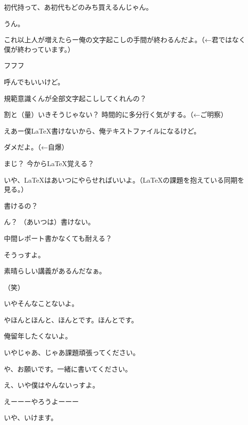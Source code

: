 \begin{multicols}{3}
{        初代持って、あ初代もどのみち買えるんじゃん。

        うん。

    


    

        これ以上人が増えたらー俺の文字起こしの手間が終わるんだよ。（←君ではなく僕が終わっています。）

        フフフ

        呼んでもいいけど。

        規範意識くんが全部文字起こししてくれんの？

        割と（量）いきそうじゃない？ 時間的に多分行く気がする。（←ご明察）

        えあー僕\LaTeX 書けないから、俺テキストファイルになるけど。

        ダメだよ。（←自爆）

        まじ？ 今から\LaTeX 覚える？

        いや、\LaTeX はあいつにやらせればいいよ。（\LaTeX の課題を抱えている同期を見る。）

        書けるの？

        ん？ （あいつは）書けない。

        中間レポート書かなくても耐える？

        そうっすよ。

        素晴らしい講義があるんだなぁ。

        （笑）

        いやそんなことないよ。

        やほんとほんと、ほんとです。ほんとです。

        俺留年したくないよ。

        いやじゃあ、じゃあ課題頑張ってください。

        や、お願いです。一緒に書いてください。

        え、いや僕はやんないっすよ。

        えーーーやろうよーーー

        いや、いけます。

}
\end{multicols}
